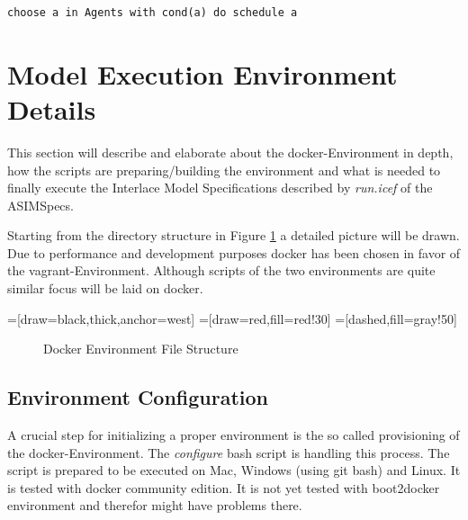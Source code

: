 \begin{lstlisting}[language=bsl]
	choose a in Agents with cond(a) do schedule a
\end{lstlisting}


\section{Model Execution Environment Details}
\label{sec:exec-env-model-details}

This section will describe and elaborate about the docker-Environment in depth, how the scripts are preparing/building the environment and what is needed to finally execute the Interlace Model Specifications described by \textit{run.icef} of the ASIMSpecs.

Starting from the directory structure in Figure \ref{fig:docker-env-file-struct} a detailed picture will be drawn. Due to performance and  development purposes docker has been chosen in favor of the vagrant-Environment. Although scripts of the two environments are quite similar focus will be laid on docker.

=[draw=black,thick,anchor=west]
=[draw=red,fill=red!30]
=[dashed,fill=gray!50]
\begin{figure}[htbp]
\centering
{}
\caption{Docker Environment File Structure}
\label{fig:docker-env-file-struct}
\end{figure}

\subsection{Environment Configuration}

A crucial step for initializing a proper environment is the so called provisioning of the docker-Environment. The \textit{configure} bash script is handling this process. The script is prepared to be executed on Mac, Windows (using git bash) and Linux. It is tested with docker community edition. It is not yet tested with boot2docker environment and therefor might have problems there.